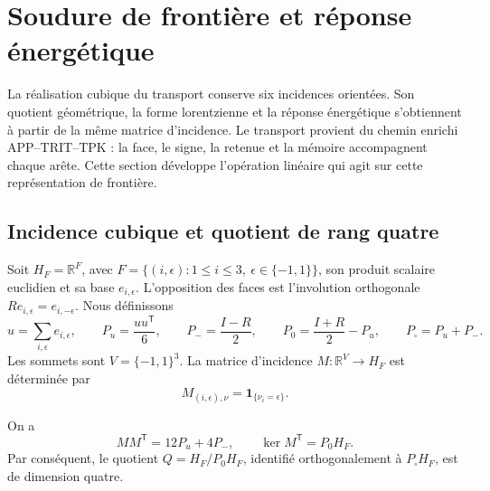 
\section{Soudure de frontière et réponse énergétique}
\label{vii:sec:pantalla-respuesta}

La réalisation cubique du transport conserve six incidences orientées.
Son quotient géométrique, la forme lorentzienne et la réponse énergétique
s’obtiennent à partir de la même matrice d’incidence. Le transport provient du
chemin enrichi APP--TRIT--TPK : la face, le signe, la retenue et la
mémoire accompagnent chaque arête. Cette section développe
l’opération linéaire qui agit sur cette représentation de frontière.

\subsection{Incidence cubique et quotient de rang quatre}
\label{vii:sec:cociente-pantalla}

Soit \(H_F=\mathbb R^F\), avec
\(F=\{(i,\epsilon):1\leq i\leq3,\ \epsilon\in\{-1,1\}\}\),
son produit scalaire euclidien et sa base \(e_{i,\epsilon}\).
L'opposition des faces est l'involution orthogonale
\(Re_{i,\epsilon}=e_{i,-\epsilon}\). Nous définissons
\[
 u=\sum_{i,\epsilon}e_{i,\epsilon},\qquad
 P_u=\frac{uu^{\mathsf T}}6,\qquad P_-=\frac{I-R}{2},\qquad
 P_0=\frac{I+R}{2}-P_u,\qquad P_\square=P_u+P_-.
\]
Les sommets sont \(V=\{-1,1\}^3\). La matrice d'incidence \(M:\mathbb R^V\longrightarrow H_F\) est déterminée par
\[
 M_{(i,\epsilon),\nu}=\mathbf1_{\{\nu_i=\epsilon\}}.
\]

\begin{proposition}
\label{vii:prop:incidencia}
On a
\[
 MM^{\mathsf T}=12P_u+4P_-,
 \qquad
 \ker M^{\mathsf T}=P_0H_F.
\]
Par conséquent, le quotient
\(Q=H_F/P_0H_F\), identifié orthogonalement à
\(P_\square H_F\), est de dimension quatre.
\end{proposition}

